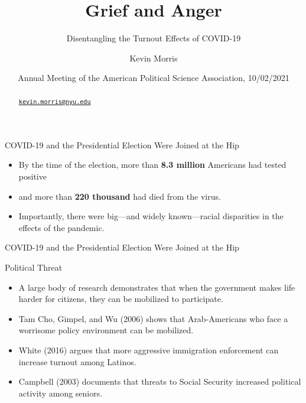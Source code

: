 \documentclass[
  ignorenonframetext,
  aspectratio=169]{beamer}
\title{Grief and Anger}
\subtitle{Disentangling the Turnout Effects of COVID-19}
\author{Kevin Morris}
\date{Annual Meeting of the American Political Science Association,
10/02/2021}
\institute{Brennan Center for Justice}
\providecommand{\tightlist}{%
  \setlength{\itemsep}{0pt}\setlength{\parskip}{0pt}}
\begin{document}
\frame{\titlepage}
\begin{abstract}
\href{mailto:kevin.morris@nyu.edu}{\nolinkurl{kevin.morris@nyu.edu}}
\end{abstract}

\begin{frame}{COVID-19 and the Presidential Election Were Joined at the
Hip}
\protect\hypertarget{covid-19-and-the-presidential-election-were-joined-at-the-hip}{}
\begin{itemize}[<+->]
\tightlist
\item
  By the time of the election, more than \textbf{8.3 million} Americans
  had tested positive
\end{itemize}

\begin{itemize}[<+->]
\tightlist
\item
  and more than \textbf{220 thousand} had died from the virus.
\end{itemize}

\begin{itemize}[<+->]
\tightlist
\item
  Importantly, there were big---and widely known---racial disparities in
  the effects of the pandemic.
\end{itemize}
\end{frame}

\begin{frame}{COVID-19 and the Presidential Election Were Joined at the
Hip}
\protect\hypertarget{covid-19-and-the-presidential-election-were-joined-at-the-hip-1}{}
\end{frame}

\begin{frame}{Political Threat}
\protect\hypertarget{political-threat}{}
\begin{itemize}[<+->]
\tightlist
\item
  A large body of research demonstrates that when the government makes
  life harder for citizens, they can be mobilized to participate.
\end{itemize}

\begin{itemize}[<+->]
\tightlist
\item
  Tam Cho, Gimpel, and Wu (2006) shows that Arab-Americans who face a
  worrisome policy environment can be mobilized.
\end{itemize}

\begin{itemize}[<+->]
\tightlist
\item
  White (2016) argues that more aggressive immigration enforcement can
  increase turnout among Latinos.
\end{itemize}

\begin{itemize}[<+->]
\tightlist
\item
  Campbell (2003) documents that threats to Social Security increased
  political activity among seniors.
\end{itemize}
\end{frame}
\end{document}
